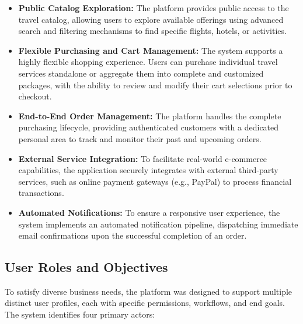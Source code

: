 \begin{itemize}
    \item \textbf{Public Catalog Exploration:} The platform provides public access to the travel catalog, allowing users to explore available offerings using advanced search and filtering mechanisms to find specific flights, hotels, or activities.
    \item \textbf{Flexible Purchasing and Cart Management:} The system supports a highly flexible shopping experience. Users can purchase individual travel services standalone or aggregate them into complete and customized packages, with the ability to review and modify their cart selections prior to checkout.
    \item \textbf{End-to-End Order Management:} The platform handles the complete purchasing lifecycle, providing authenticated customers with a dedicated personal area to track and monitor their past and upcoming orders.
    \item \textbf{External Service Integration:} To facilitate real-world e-commerce capabilities, the application securely integrates with external third-party services, such as online payment gateways (e.g., PayPal) to process financial transactions.
    \item \textbf{Automated Notifications:} To ensure a responsive user experience, the system implements an automated notification pipeline, dispatching immediate email confirmations upon the successful completion of an order.
\end{itemize}

\subsection{User Roles and Objectives}

To satisfy diverse business needs, the platform was designed to support multiple distinct user profiles, each with specific permissions, workflows, and end goals. The system identifies four primary actors:

